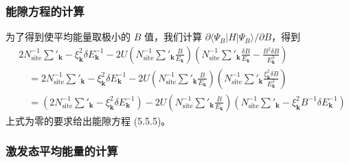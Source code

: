 \subsubsection{能隙方程的计算}

为了得到使平均能量取极小的 $B$ 值，我们计算 $\partial\langle\Psi_{B}|H|\Psi_{B}\rangle/\partial B$，得到
\begin{align*}
&2N^{-1}_{\mathrm{site}}\sum'_{\pmb{k}}-\xi^{2}_{\pmb{k}}\delta E^{-1}_{\pmb{k}}-2U\left(N^{-1}_{\mathrm{site}}\sum'_{\pmb{k}}\frac{B}{E_{\pmb{k}}}\right)\left(N^{-1}_{\mathrm{site}}\sum'_{\pmb{k}}\frac{\delta B}{E_{\pmb{k}}}-\frac{B^{2}\delta B}{E^{3}_{\pmb{k}}}\right)\\
&\quad=2N^{-1}_{\mathrm{site}}\sum'_{\pmb{k}}-\xi^{2}_{\pmb{k}}\delta E^{-1}_{\pmb{k}}-2U\left(N^{-1}_{\mathrm{site}}\sum'_{\pmb{k}}\frac{B}{E_{\pmb{k}}}\right)\left(N^{-1}_{\mathrm{site}}\sum'_{\pmb{k}}\frac{\xi^{2}_{\pmb{k}}\delta B}{E^{3}_{\pmb{k}}}\right)\\
&\quad=\left(2N^{-1}_{\mathrm{site}}\sum'_{\pmb{k}}-\xi^{2}_{\pmb{k}}\delta E^{-1}_{\pmb{k}}\right)-2U\left(N^{-1}_{\mathrm{site}}\sum'_{\pmb{k}}\frac{B}{E_{\pmb{k}}}\right)\left(N^{-1}_{\mathrm{site}}\sum'_{\pmb{k}}-\xi^{2}_{\pmb{k}}B^{-1}\delta E^{-1}_{\pmb{k}}\right)
\end{align*}
上式为零的要求给出能隙方程 (5.5.5)。

\subsubsection{激发态平均能量的计算}

